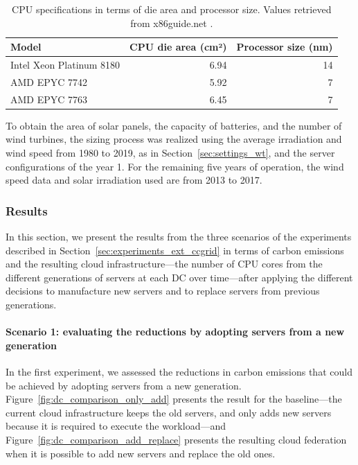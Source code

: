 \begin{table}[h]
  \small
  \caption{CPU specifications in terms of die area and processor size. Values retrieved from x86guide.net \cite{ref_amd_epyc_7742,ref_amd_epyc_7763,ref_xeon_platinum_8180}.} \centering
  \label{tab:cpu_specs} 
  \begin{tabular}{|l|r|r|}
   \hline

  \textbf{Model}  & \textbf{CPU die area (cm²)} & \textbf{Processor size (nm) } \\
    \hline
    Intel Xeon Platinum 8180 & 6.94 & 14\\
    \hline
    AMD EPYC 7742  & 5.92 & 7 \\
   \hline
    AMD EPYC 7763 & 6.45   & 7 \\
  \hline
\end{tabular}  
\end{table}

To obtain the area of solar panels, the capacity of batteries, and the number of wind turbines, the sizing process was realized using the average irradiation and wind speed from 1980 to 2019, as in Section~\ref{sec:settings_wt}, and the server configurations of the year 1. For the remaining five years of operation, the wind speed data and solar irradiation used are from 2013 to 2017.
\subsubsection{Results}

In this section, we present the results from the three scenarios of the experiments described in Section~\ref{sec:experiments_ext_ccgrid} in terms of carbon emissions and the resulting cloud infrastructure---the number of CPU cores from the different generations of servers at each DC over time---after applying the different decisions to manufacture new servers and to replace servers from previous generations.

\paragraph{Scenario 1: evaluating the  reductions by adopting servers from a new generation } 
\label{sec:results_experiments_extension_scenario_1}
In the first experiment, we assessed the reductions in carbon emissions that could be achieved by adopting servers from a new generation. Figure~\ref{fig:dc_comparison_only_add} presents the result for the baseline---the current cloud infrastructure keeps the old servers, and only adds new servers because it is required to execute the workload---and Figure~\ref{fig:dc_comparison_add_replace} presents the resulting cloud federation when it is possible to add new servers and replace the old ones.

